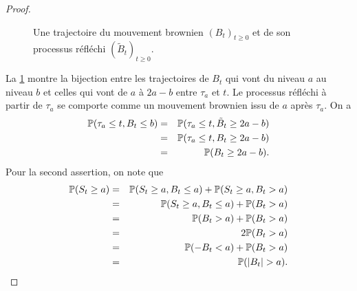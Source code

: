 \begin{proof}
\begin{figure}[!h]
\begin{center}
\end{center}
\caption{Une trajectoire du mouvement brownien $(B_t)_{t\geq 0}$ et de son processus réfléchi $(\tilde{B}_t)_{t\geq0}$.}
\label{fig:trajectory_reflected_bm}
\end{figure}
La \cref{fig:trajectory_reflected_bm} montre la bijection entre les trajectoires de $B_t$ qui vont du niveau $a$ au niveau $b$ et celles qui vont de $a$ à $2a - b$ entre $\tau_a$ et $t$. Le processus réfléchi à partir de $\tau_a$ se comporte comme un mouvement brownien issu de $a$ après $\tau_a$. On a 
\begin{eqnarray*}
\mathbb{P}(\tau_a\leq t, B_t \leq  b)&=&\mathbb{P}(\tau_a\leq t, \tilde{B}_t \geq  2a-b)\\
&=&\mathbb{P}(\tau_a\leq t, B_t \geq  2a-b)\\
&=&\mathbb{P}( B_t \geq  2a-b).
\end{eqnarray*}
Pour la second assertion, on note que 
\begin{eqnarray*}
\mathbb{P}(S_t \geq a ) &=&\mathbb{P}(S_t \geq a, B_t \leq a ) + \mathbb{P}(S_t \geq a, B_t > a )\\
&=&\mathbb{P}(S_t \geq a, B_t \leq a ) + \mathbb{P}( B_t > a )\\
&=&\mathbb{P}( B_t > a ) +  \mathbb{P}( B_t > a )\\
&=&2\mathbb{P}( B_t > a )\\
&=&\mathbb{P}( -B_t < a ) + \mathbb{P}( B_t > a )\\
&=&\mathbb{P}( |B_t| > a ).
\end{eqnarray*}
\end{proof}

